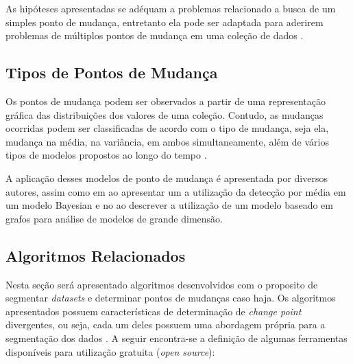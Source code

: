 As hipóteses apresentadas se adéquam a problemas relacionado a busca de um simples ponto de mudança, entretanto ela pode ser adaptada para aderirem problemas de múltiplos pontos de mudança em uma coleção de dados \cite{Chen1-2000}. 

\subsection{Tipos de Pontos de Mudança} 

Os pontos de mudança podem ser observados a partir de uma representação gráfica das distribuições dos valores de uma coleção. Contudo, as mudanças ocorridas podem ser classificadas de acordo com o tipo de mudança, seja ela, mudança na média, na variância, em ambos simultaneamente, além de vários tipos de modelos propostos ao longo do tempo \cite{Chen2-2000}. 

A aplicação desses modelos de ponto de mudança é apresentada por diversos autores, assim como em \cite{Cheon2010} ao apresentar um a utilização da detecção por média em um modelo Bayesian e no \cite{Shi2017} ao descrever a utilização de um modelo baseado em grafos para análise de modelos de grande dimensão. 





\subsection{Algoritmos Relacionados}

Nesta seção será apresentado algoritmos desenvolvidos com o proposito de segmentar \textit{datasets} e determinar pontos de mudanças caso haja. Os algoritmos apresentados possuem características de determinação de \textit{change point} divergentes, ou seja, cada um deles possuem uma abordagem própria para a segmentação dos dados \cite{Aminikhanghahi2017}. A seguir encontra-se a definição de algumas ferramentas disponíveis para utilização gratuita (\textit{open source}):

